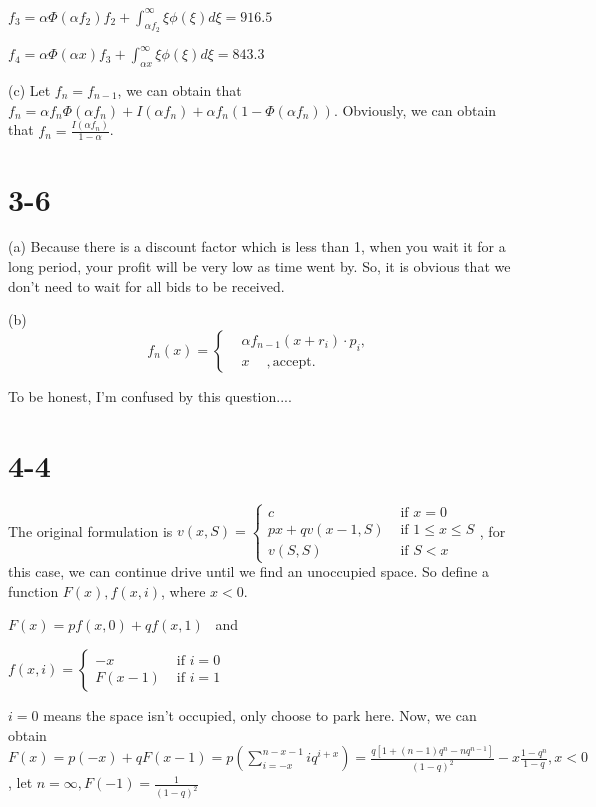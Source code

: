 \documentclass[UTF8]{article}
\begin{document}
$f_3 = \alpha \Phi(\alpha f_2) f_2 + \int_{\alpha f_2}^{\infty}\xi \phi(\xi) d \xi = 916.5$

$f_4 = \alpha \Phi(\alpha x) f_3 + \int_{\alpha x}^{\infty}\xi \phi(\xi) d \xi = 843.3$

(c) Let $f_n = f_{n-1}$, we can obtain that
$f_n = \alpha f_n \Phi(\alpha f_n) + I(\alpha f_n)+ \alpha f_n (1-\Phi(\alpha f_n))$.
Obviously, we can obtain that $f_n = \frac{I(\alpha f_n)}{1-\alpha}$.

\section*{3-6}

(a) Because there is a discount factor which is less than 1, when you wait it for a long period, your profit will be very low as time went by. So, it is obvious that we don't need to wait for all bids to be received.

(b)
$$ f_n(x)=\left\{
\begin{aligned}
& \alpha f_{n-1}(x+r_i)\cdot p_i,  \\
& x ~\quad, \text{accept}.
\end{aligned}
\right.
$$

To be honest, I'm confused by this question....

\section*{4-4}
The original formulation is
$v(x, S)=\left\{\begin{array}{ll}c & \text { if } x=0 \\ p x+q v(x-1, S) & \text { if } 1 \leq x \leq S \\ v(S, S) & \text { if } S<x\end{array}\right.$,
for this case, we can continue drive until we find an unoccupied space. So define a function $F(x),f(x,i)$, where $x<0$.

$F(x) = pf(x,0)+qf(x,1)$ ~and

$f(x, i)=\left\{\begin{array}{ll}
-x & \text { if } i=0 \\
F(x-1) & \text { if } i=1
\end{array}\right.$

$i= 0$ means the space isn't occupied, only choose to park here.
Now, we can obtain $F(x) = p(-x)+qF(x-1) = p(\sum_{i=-x}^{n-x-1} iq^{i+x}) = \frac{q[1+(n-1)q^n-nq^{n-1}]}{(1-q)^2}-x\frac{1-q^n}{1-q}
, x<0$, let $n = \infty,F(-1) = \frac{1}{(1-q)^2}$
\end{document}
